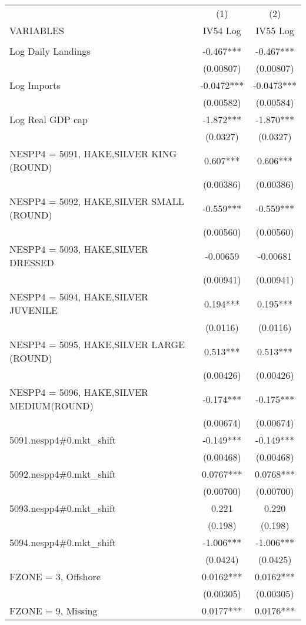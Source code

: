 \begin{tabular}{lcc} \hline
 & (1) & (2) \\
VARIABLES & IV54 Log & IV55 Log \\ \hline
 &  &  \\
Log Daily Landings & -0.467*** & -0.467*** \\
 & (0.00807) & (0.00807) \\
Log Imports & -0.0472*** & -0.0473*** \\
 & (0.00582) & (0.00584) \\
Log Real GDP cap & -1.872*** & -1.870*** \\
 & (0.0327) & (0.0327) \\
NESPP4 = 5091, HAKE,SILVER KING (ROUND) & 0.607*** & 0.606*** \\
 & (0.00386) & (0.00386) \\
NESPP4 = 5092, HAKE,SILVER SMALL (ROUND) & -0.559*** & -0.559*** \\
 & (0.00560) & (0.00560) \\
NESPP4 = 5093, HAKE,SILVER DRESSED & -0.00659 & -0.00681 \\
 & (0.00941) & (0.00941) \\
NESPP4 = 5094, HAKE,SILVER JUVENILE & 0.194*** & 0.195*** \\
 & (0.0116) & (0.0116) \\
NESPP4 = 5095, HAKE,SILVER LARGE (ROUND) & 0.513*** & 0.513*** \\
 & (0.00426) & (0.00426) \\
NESPP4 = 5096, HAKE,SILVER MEDIUM(ROUND) & -0.174*** & -0.175*** \\
 & (0.00674) & (0.00674) \\
5091.nespp4\#0.mkt\_shift & -0.149*** & -0.149*** \\
 & (0.00468) & (0.00468) \\
5092.nespp4\#0.mkt\_shift & 0.0767*** & 0.0768*** \\
 & (0.00700) & (0.00700) \\
5093.nespp4\#0.mkt\_shift & 0.221 & 0.220 \\
 & (0.198) & (0.198) \\
5094.nespp4\#0.mkt\_shift & -1.006*** & -1.006*** \\
 & (0.0424) & (0.0425) \\
FZONE = 3, Offshore & 0.0162*** & 0.0162*** \\
 & (0.00305) & (0.00305) \\
FZONE = 9, Missing & 0.0177*** & 0.0176*** \\

\end{tabular}
